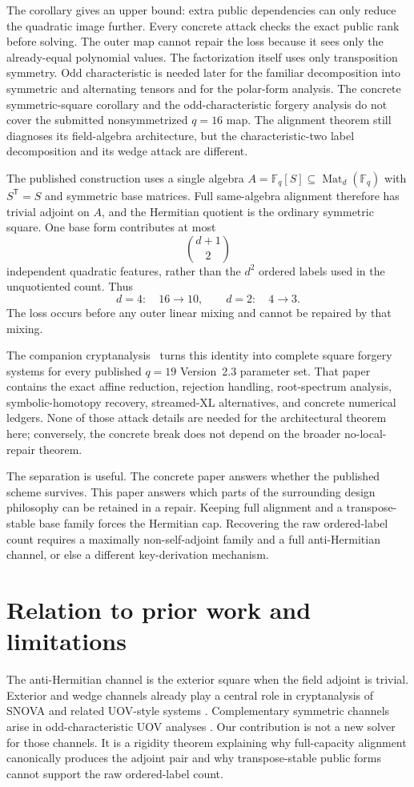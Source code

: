 \documentclass[11pt]{article}
\newcommand{\F}{\mathbb F}
\newcommand{\Mat}{\operatorname{Mat}}
\newcommand{\transpose}{\mathsf T}
\begin{document}
The corollary gives an upper bound: extra public dependencies can only reduce
the quadratic image further.  Every concrete attack checks the exact public
rank before solving.  The outer map cannot repair the loss because it sees only
the already-equal polynomial values.  The factorization itself uses only
transposition symmetry.  Odd characteristic is needed later for the familiar
decomposition into symmetric and alternating tensors and for the polar-form
analysis.  The concrete symmetric-square corollary and the
odd-characteristic forgery analysis do not cover the submitted nonsymmetrized
$q=16$ map.  The alignment theorem still diagnoses its field-algebra
architecture, but the characteristic-two label decomposition and its wedge
attack are different.

The published construction uses a single algebra
$A=\F_q[S]\subseteq\Mat_d(\F_q)$ with $S^\transpose=S$ and symmetric base
matrices.  Full same-algebra alignment therefore has trivial adjoint on $A$,
and the Hermitian quotient is the ordinary symmetric square.  One base form
contributes at most
\[
  \binom{d+1}{2}
\]
independent quadratic features, rather than the $d^2$ ordered labels used in
the unquotiented count.  Thus
\[
 d=4:\quad 16\longrightarrow10,
 \qquad
 d=2:\quad 4\longrightarrow3.
\]
The loss occurs before any outer linear mixing and cannot be repaired by that
mixing.

The companion cryptanalysis~\cite{ThalerEtAl2026SymmetryQuotient} turns this
identity into complete square forgery systems for every published $q=19$
Version~2.3 parameter set.  That paper contains the exact affine reduction,
rejection handling, root-spectrum analysis, symbolic-homotopy recovery,
streamed-XL alternatives, and concrete numerical ledgers.  None of those
attack details are needed for the architectural theorem here; conversely, the
concrete break does not depend on the broader no-local-repair theorem.

The separation is useful.  The concrete paper answers whether the published
scheme survives.  This paper answers which parts of the surrounding design
philosophy can be retained in a repair.  Keeping full alignment and a
transpose-stable base family forces the Hermitian cap.  Recovering the raw
ordered-label count requires a maximally non-self-adjoint family and a full
anti-Hermitian channel, or else a different key-derivation mechanism.

\section{Relation to prior work and limitations}\label{sec:prior-scope}
The anti-Hermitian channel is the exterior square when the field adjoint is
trivial.  Exterior and wedge channels already play a central role in
cryptanalysis of SNOVA and related UOV-style systems
\cite{BrosEtAl2026SNOVAWedge,TsengEtAl2026Wedge}.  Complementary symmetric
channels arise in odd-characteristic UOV analyses
\cite{Ran2026,JinEtAl2026}.  Our contribution is not a new solver for those
channels.  It is a rigidity theorem explaining why full-capacity alignment
canonically produces the adjoint pair and why transpose-stable public forms
cannot support the raw ordered-label count.
\end{document}
